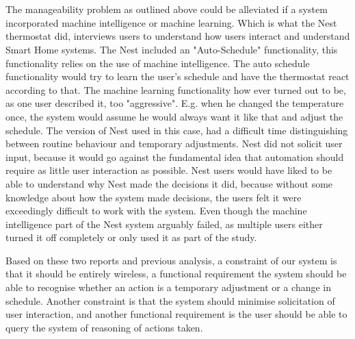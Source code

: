 \\\\
The manageability problem as outlined above could be alleviated if a system incorporated machine intelligence or machine learning. Which is what the Nest thermostat did, \cite{AdaptiveInterviews} interviews users to understand how users interact and understand Smart Home systems. The Nest included an "Auto-Schedule" functionality, this functionality relies on the use of machine intelligence. The auto schedule functionality would try to learn the user's schedule and have the thermostat react according to that. The machine learning functionality how ever turned out to be, as one user described it\cite{AdaptiveInterviews}, too "aggressive". E.g. when he changed the temperature once, the system would assume he would always want it like that and adjust the schedule. The version of Nest used in this case, had a difficult time distinguishing between routine behaviour and temporary adjustments. Nest did not solicit user input, because it would go against the fundamental idea that automation should require as little user interaction as possible. Nest users would have liked to be able to understand why Nest made the decisions it did, because without some knowledge about how the system made decisions, the users felt it were exceedingly difficult to work with the system.
Even though the machine intelligence part of the Nest system\cite{AdaptiveInterviews} arguably failed, as multiple users either turned it off completely or only used it as part of the study.

Based on these two reports and previous analysis, a constraint of our system is that it should be entirely wireless, a functional requirement the system should be able to recognise whether an action is a temporary adjustment or a change in schedule. Another constraint is that the system should minimise solicitation of user interaction, and another functional requirement is the user should be able to query the system of reasoning of actions taken.
